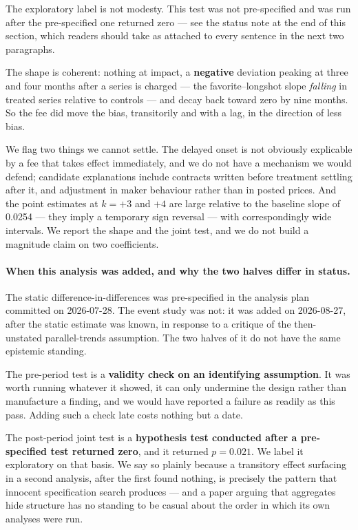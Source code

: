 \documentclass[preprint,12pt,authoryear]{elsarticle}
\begin{document}
The exploratory label is not modesty. This test was not pre-specified and was
run after the pre-specified one returned zero --- see the status note at the end
of this section, which readers should take as attached to every sentence in the
next two paragraphs.

The shape is coherent: nothing at impact, a \textbf{negative} deviation peaking
at three and four months after a series is charged --- the favorite--longshot
slope \emph{falling} in treated series relative to controls --- and decay back
toward zero by nine months. So the fee did move the bias, transitorily and with
a lag, in the direction of less bias.

We flag two things we cannot settle. The delayed onset is not obviously
explicable by a fee that takes effect immediately, and we do not have a
mechanism we would defend; candidate explanations include contracts written
before treatment settling after it, and adjustment in maker behaviour rather
than in posted prices. And the point estimates at $k=+3$ and $+4$ are large
relative to the baseline slope of 0.0254 --- they imply a temporary sign
reversal --- with correspondingly wide intervals. We report the shape and the
joint test, and we do not build a magnitude claim on two coefficients.

\paragraph{When this analysis was added, and why the two halves differ in
status.} The static difference-in-differences was pre-specified in the analysis
plan committed on 2026-07-28. The event study was not: it was added on
2026-08-27, after the static estimate was known, in response to a critique of
the then-unstated parallel-trends assumption. The two halves of it do not have
the same epistemic standing.

The pre-period test is a \textbf{validity check on an identifying assumption}.
It was worth running whatever it showed, it can only undermine the design rather
than manufacture a finding, and we would have reported a failure as readily as
this pass. Adding such a check late costs nothing but a date.

The post-period joint test is a \textbf{hypothesis test conducted after a
pre-specified test returned zero}, and it returned $p = 0.021$. We label it
exploratory on that basis. We say so plainly because a transitory effect
surfacing in a second analysis, after the first found nothing, is precisely the
pattern that innocent specification search produces --- and a paper arguing that
aggregates hide structure has no standing to be casual about the order in which
its own analyses were run.
\end{document}
